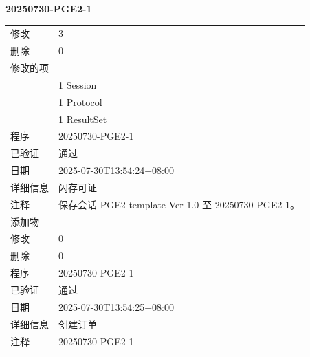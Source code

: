 \documentclass[UTF8,10pt,a4paper,fontset=fandol]{ctexart}
\newcommand{\fieldvalue}[1]{#1}
\begin{document}

\newpage

\noindent\textbf{20250730-PGE2-1}

\begin{tabular}{ll}
修改 &
\fieldvalue{3}\\
删除 &
\fieldvalue{0}\\
\multicolumn{2}{l}{修改的项}\\
&
\fieldvalue{1}\quad
\fieldvalue{Session}\\
&
\fieldvalue{1}\quad
\fieldvalue{Protocol}\\
&
\fieldvalue{1}\quad
\fieldvalue{ResultSet}\\[2pt]

程序 &
\fieldvalue{20250730-PGE2-1}\\
已验证 &
\fieldvalue{通过}\\
日期 &
\fieldvalue{2025-07-30T13:54:24+08:00}\\
详细信息 &
\fieldvalue{闪存可证}\\
注释 &
\fieldvalue{保存会话 PGE2 template Ver 1.0 至 20250730-PGE2-1。}\\[2pt]

添加物 &
\fieldvalue{}\\
修改 &
\fieldvalue{0}\\
删除 &
\fieldvalue{0}\\[2pt]

程序 &
\fieldvalue{20250730-PGE2-1}\\
已验证 &
\fieldvalue{通过}\\
日期 &
\fieldvalue{2025-07-30T13:54:25+08:00}\\
详细信息 &
\fieldvalue{创建订单}\\
注释 &
\fieldvalue{20250730-PGE2-1}\\[2pt]


\end{tabular}
\end{document}
